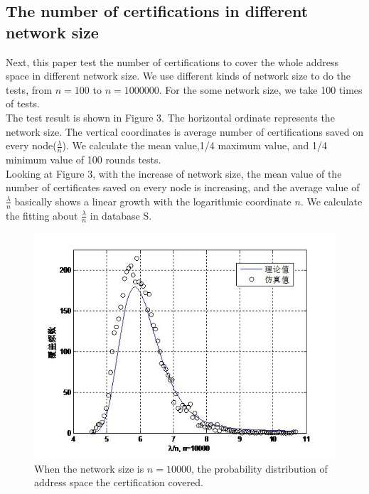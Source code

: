 \documentclass[10pt]{article}
\begin{document}
\subsection{The number of certifications in different network size}
 Next, this paper test the number of certifications to cover the whole address space in different network size. We use different kinds of network size to do the tests, from $n=100$ to $n=1000000$. For the some network size, we take 100 times of tests.\\
 The test result is shown in Figure 3. The horizontal ordinate represents the network size. The vertical coordinates is average number of certifications saved on every node($\frac{\lambda}{n}$). We calculate the mean value,1/4 maximum value, and 1/4 minimum value of 100 rounds tests. \\
 Looking at Figure 3, with the increase of network size, the mean value of the number of certificates saved on every node is increasing, and the average value of $\frac{\lambda}{n}$ basically shows a linear growth with the logarithmic coordinate $n$. We calculate the fitting about $\frac{\lambda}{n}$ in database S. 
\begin{figure}[htbp]
\centering
\includegraphics[bb=0 0 410 307,scale=.8]{2.jpg}
\caption{When the network size is $n=10000$, the probability distribution of address space the certification covered.}
\label{fig:f2}
\end{figure}
\end{document}
